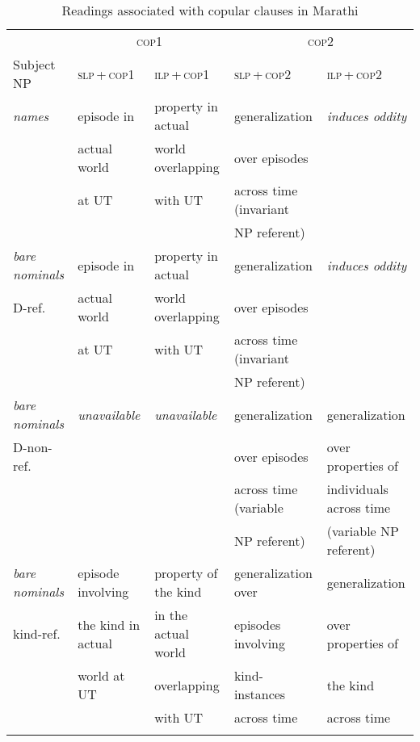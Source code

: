 \documentclass[output=paper,hidelinks]{langscibook}
\begin{document}
\begin{exe}
\begin{xlist}
\begin{xlist}
\begin{exe}
\begin{exe}
\begin{exe}
\begin{sidewaystable}\small
\caption{Readings associated with copular clauses in Marathi\label{presenttable}}
\begin{tabular}{lllll}
\lsptoprule
                & \multicolumn{2}{c}{\textsc{cop1}} & \multicolumn{2}{c}{\textsc{cop2}}\\
\cmidrule(lr){2-3}\cmidrule(lr){4-5}
Subject NP      & \textsc{slp\,+\,cop1} & \textsc{ilp\,+\,cop1} & \textsc{slp\,+\,cop2} & \textsc{ilp\,+\,cop2}\\
\midrule
\emph{names}    & episode in & property in actual & generalization & \textit{induces oddity}\\
                & actual world & world overlapping & over episodes &\\
                & at UT & with UT & across time (invariant &\\
                & & & NP referent) &\\
\midrule
\emph{bare nominals} & episode in & property in actual & generalization & \textit{induces oddity}\\
D-ref.          & actual world & world overlapping & over episodes &\\
                & at UT & with UT & across time (invariant &\\
                & & & NP referent) &\\
\midrule
\emph{bare nominals} & \textit{unavailable} & \textit{unavailable} & generalization & generalization\\
D-non-ref.      & & & over episodes & over properties of\\
                & & & across time (variable & individuals across time\\
                & & & NP referent) & (variable NP referent)\\
\midrule
\emph{bare nominals} & episode involving & property of the kind & generalization over & generalization\\
kind-ref.       & the kind in actual & in the actual world & episodes involving & over properties of\\
                & world at UT & overlapping & kind-instances & the kind\\
                & & with UT & across time & across time\\
\lspbottomrule
\end{tabular}
\end{sidewaystable}


\end{exe}
\end{exe}
\end{exe}
\end{xlist}
\end{xlist}
\end{exe}
\end{document}
